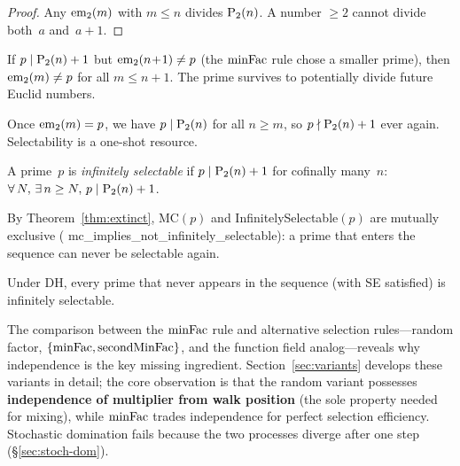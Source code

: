 \begin{proof}
Any $\mathrm{em}_{2}(m)$ with $m \leq n$ divides $\mathrm{P}_{2}(n)$.  A number $\geq 2$
cannot divide both~$a$ and~$a+1$.
\end{proof}

\begin{theorem}
If $p \mid \mathrm{P}_{2}(n)+1$ but $\mathrm{em}_{2}(n\!+\!1) \neq p$ (the $\mathrm{minFac}$ rule
chose a smaller prime), then $\mathrm{em}_{2}(m) \neq p$ for all $m \leq n+1$.
The prime survives to potentially divide future Euclid numbers.
\end{theorem}

\begin{theorem}
\label{thm:extinct}
Once $\mathrm{em}_{2}(m) = p$, we have $p \mid \mathrm{P}_{2}(n)$ for all $n \geq m$, so
$p \nmid \mathrm{P}_{2}(n)+1$ ever again.  Selectability is a one-shot resource.
\end{theorem}

\begin{definition}\label{def:inf-sel}
A prime~$p$ is \emph{infinitely selectable} if $p \mid \mathrm{P}_{2}(n)+1$ for
cofinally many~$n$: $\forall\, N,\, \exists\, n \geq N,\,
p \mid \mathrm{P}_{2}(n)+1$.
\end{definition}

By Theorem~\ref{thm:extinct}, MC$(p)$ and
Infinitely\-Selectable$(p)$ are mutually exclusive
(%
{mc\_implies\_not\_infinitely\_selectable}):
a prime that enters the sequence can never be selectable again.

\begin{theorem}
\label{thm:dh-inf-sel}
Under DH, every prime that never appears in the sequence (with SE
satisfied) is infinitely selectable.
\end{theorem}

The comparison between the $\mathrm{minFac}$ rule and alternative selection
rules---random factor, $\{\mathrm{minFac}, \operatorname{secondMinFac}\}$,
and the function field analog---reveals why independence is the key
missing ingredient.  Section~\ref{sec:variants} develops these
variants in detail; the core observation is that the random variant
possesses \textbf{independence of multiplier from walk position}
(the sole property needed for mixing), while $\mathrm{minFac}$ trades
independence for perfect selection efficiency.  Stochastic domination
fails because the two processes diverge after one step
(\S\ref{sec:stoch-dom}).

